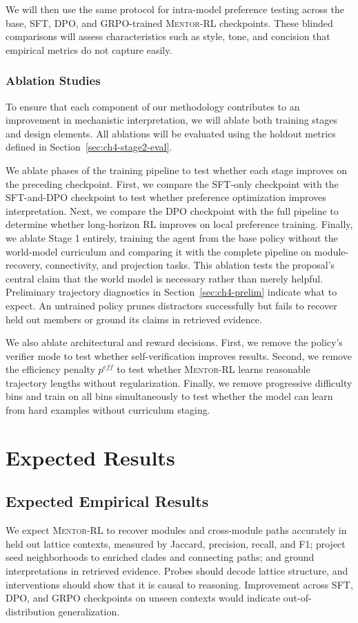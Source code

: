 \documentclass[thesis,letterpaper,12pt]{utthesis}
\begin{document}
We will then use the same protocol for intra-model preference testing across the base, SFT, DPO, and GRPO-trained \textsc{Mentor-RL} checkpoints. These blinded comparisons will assess characteristics such as style, tone, and concision that empirical metrics do not capture easily.

\subsubsection{Ablation Studies}
To ensure that each component of our methodology contributes to an improvement in mechanistic interpretation, we will ablate both training stages and design elements. All ablations will be evaluated using the holdout metrics defined in Section~\ref{sec:ch4-stage2-eval}.

We ablate phases of the training pipeline to test whether each stage improves on the preceding checkpoint. First, we compare the SFT-only checkpoint with the SFT-and-DPO checkpoint to test whether preference optimization improves interpretation. Next, we compare the DPO checkpoint with the full pipeline to determine whether long-horizon RL improves on local preference training. Finally, we ablate Stage 1 entirely, training the agent from the base policy without the world-model curriculum and comparing it with the complete pipeline on module-recovery, connectivity, and projection tasks. This ablation tests the proposal's central claim that the world model is necessary rather than merely helpful. Preliminary trajectory diagnostics in Section~\ref{sec:ch4-prelim} indicate what to expect. An untrained policy prunes distractors successfully but fails to recover held out members or ground its claims in retrieved evidence.

We also ablate architectural and reward decisions. First, we remove the policy's verifier mode to test whether self-verification improves results. Second, we remove the efficiency penalty $p^{eff}$ to test whether \textsc{Mentor-RL} learns reasonable trajectory lengths without regularization. Finally, we remove progressive difficulty bins and train on all bins simultaneously to test whether the model can learn from hard examples without curriculum staging.

\section{Expected Results}
\subsection{Expected Empirical Results}
We expect \textsc{Mentor-RL} to recover modules and cross-module paths accurately in held out lattice contexts, measured by Jaccard, precision, recall, and F1; project seed neighborhoods to enriched clades and connecting paths; and ground interpretations in retrieved evidence. Probes should decode lattice structure, and interventions should show that it is causal to reasoning. Improvement across SFT, DPO, and GRPO checkpoints on unseen contexts would indicate out-of-distribution generalization.
\end{document}
